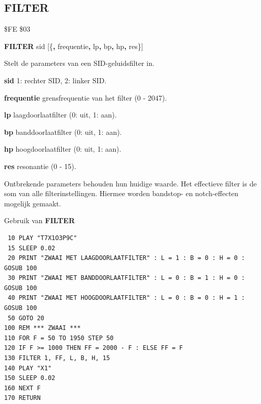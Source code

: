 \subsection{FILTER}
\begin{description}[leftmargin=2cm,style=nextline]
\item [Token:]    \$FE \$03

\item [Formaat:]   {\bf FILTER} sid [\{{\bf,} frequentie{\bf,} lp{\bf,} bp{\bf,} hp{\bf,} res\}]

\item [Gebruik:]    Stelt de parameters van een SID-geluidsfilter in.

                  {\bf sid} 1: rechter SID, 2: linker SID.

                  {\bf frequentie} grensfrequentie van het filter (0 - 2047).

                  {\bf lp} laagdoorlaatfilter (0: uit, 1: aan).

                  {\bf bp} banddoorlaatfilter (0: uit, 1: aan).

                  {\bf hp} hoogdoorlaatfilter (0: uit, 1: aan).

{\bf res} resonantie (0 - 15).

\item [Opmerkingen:]  Ontbrekende parameters behouden hun huidige waarde. Het effectieve filter is de som van alle filterinstellingen. Hiermee worden bandstop- en notch-effecten mogelijk gemaakt.

\item [Voorbeeld:]  Gebruik van {\bf FILTER}

\begin{tcolorbox}[colback=black,coltext=white]
\verbatimfont{\codefont}
\begin{verbatim}
 10 PLAY "T7X1O3P9C"
 15 SLEEP 0.02
 20 PRINT "ZWAAI MET LAAGDOORLAATFILTER" : L = 1 : B = 0 : H = 0 : GOSUB 100
 30 PRINT "ZWAAI MET BANDDOORLAATFILTER" : L = 0 : B = 1 : H = 0 : GOSUB 100
 40 PRINT "ZWAAI MET HOOGDOORLAATFILTER" : L = 0 : B = 0 : H = 1 : GOSUB 100
 50 GOTO 20
100 REM *** ZWAAI ***
110 FOR F = 50 TO 1950 STEP 50
120 IF F >= 1000 THEN FF = 2000 - F : ELSE FF = F
130 FILTER 1, FF, L, B, H, 15
140 PLAY "X1"
150 SLEEP 0.02
160 NEXT F
170 RETURN
\end{verbatim}
\end{tcolorbox}
\end{description}


